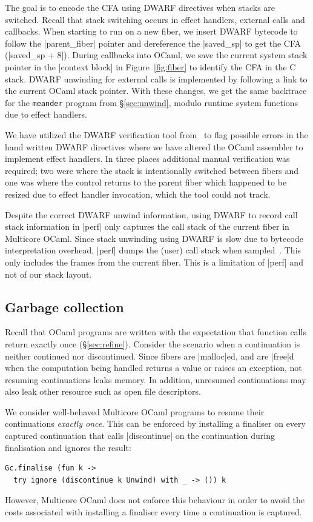 \documentclass[sigplan,10pt,review,anonymous]{acmart}\settopmatter{printfolios=true,printccs=false,printacmref=false}
\begin{document}
The goal is to encode the CFA using DWARF directives when stacks are switched.
Recall that stack switching occurs in effect handlers, external calls and
callbacks. When starting to run on a new fiber, we insert DWARF bytecode to
follow the |parent_fiber| pointer and dereference the |saved_sp| to get the CFA
(|saved_sp + 8|). During callbacks into OCaml, we save the current system stack
pointer in the |context block| in Figure~\ref{fig:fiber} to identify the CFA in
the C stack. DWARF unwinding for external calls is implemented by following a
link to the current OCaml stack pointer. With these changes, we get the same
backtrace for the \texttt{meander} program from \S\ref{sec:unwind}, modulo
runtime system functions due to effect handlers.

We have utilized the DWARF verification tool from~\cite{Bastian19} to flag
possible errors in the hand written DWARF directives where we have altered the
OCaml assembler to implement effect handlers. In three places additional manual
verification was required; two were where the stack is intentionally switched
between fibers and one was where the control returns to the parent fiber which
happened to be resized due to effect handler invocation, which the tool could
not track.

Despite the correct DWARF unwind information, using DWARF to record call stack
information in |perf| only captures the call stack of the current fiber in
Multicore OCaml. Since stack unwinding using DWARF is slow due to bytecode
interpretation overhead, |perf| dumps the (user) call stack when
sampled~\cite{Bastian19}. This only includes the frames from the current fiber.
This is a limitation of |perf| and not of our stack layout.

\vspace{-2mm}
\subsection{Garbage collection}

Recall that OCaml programs are written with the expectation that function calls
return exactly once (\S\ref{sec:refine}). Consider the scenario when a
continuation is neither continued nor discontinued. Since fibers are
|malloc|ed, and are |free|d when the computation being handled returns a value
or raises an exception, not resuming continuations leaks memory. In addition,
unresumed continuations may also leak other resource such as open file
descriptors.

We consider well-behaved Multicore OCaml programs to resume their continuations
\emph{exactly once}. This can be enforced by installing a finaliser on every
captured continuation that calls |discontinue| on the continuation during
finalisation and ignores the result:
\begin{lstlisting}
Gc.finalise (fun k ->
  try ignore (discontinue k Unwind) with _ -> ()) k
\end{lstlisting}
However, Multicore OCaml does not enforce this behaviour in order to avoid the
costs associated with installing a finaliser every time a continuation is
captured.
\end{document}
